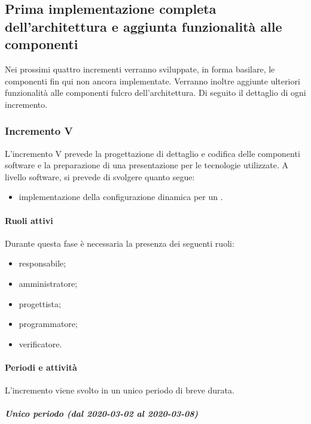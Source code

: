 		
		\subsection{Prima implementazione completa dell'architettura e aggiunta funzionalità alle componenti}
		Nei prossimi quattro incrementi verranno sviluppate, in forma basilare, le componenti fin qui non ancora implementate. Verranno inoltre aggiunte ulteriori funzionalità alle componenti fulcro dell'architettura. \newline
		Di seguito il dettaglio di ogni incremento.
		
		
		\subsubsection{Incremento V}
			
			L'incremento V prevede la progettazione di dettaglio e codifica delle componenti software e la preparazione di una presentazione per le tecnologie utilizzate. A livello software, si prevede di svolgere quanto segue:
			\begin{itemize}
				\item implementazione della configurazione dinamica per un .
			\end{itemize}
			
			\paragraph{Ruoli attivi}
			
				Durante questa fase è necessaria la presenza dei seguenti ruoli:
				\begin{itemize}
					\item responsabile;
					\item amministratore;
					\item progettista;
					\item programmatore;
					\item verificatore.
				\end{itemize}
			
			\paragraph{Periodi e attività}
			
				L'incremento viene svolto in un unico periodo di breve durata.
				
				\subparagraph{Unico periodo (dal 2020-03-02 al 2020-03-08)}
				
